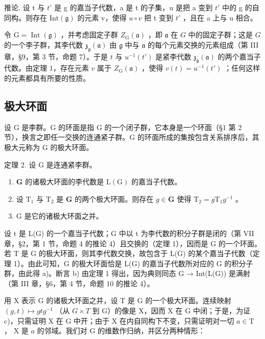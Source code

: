 推论. 设 t 与 \(t'\) 是 g 的嘉当子代数，a 是 t 的子集，u 是把 a 变到 \(t'\) 中的 g 的自同构。则存在 \(\text{Int}(\mathfrak{g})\) 的元素 v，使得 \(u \circ v\) 把 t 变到 \(t'\) ，且在 a 上与 u 相合。

令 \(\mathrm{G} = \operatorname{Int}(\mathfrak{g})\) ，并考虑固定子群 \(Z_{\mathrm{G}}(\mathfrak{a})\) ，即 \(\mathfrak{a}\) 在 \(G\) 中的固定子群；这是 \(G\) 的一个李子群，其李代数 \(\mathfrak{z}_{\mathfrak{g}}(\mathfrak{a})\) 由 \(\mathfrak{g}\) 中与 \(\mathfrak{a}\) 的每个元素交换的元素组成（第 III 章，§9，第 3 节，命题 7）。于是 \(t\) 与 \(u^{-1}(t')\) 是紧李代数 \(\mathfrak{z}_{\mathfrak{g}}(\mathfrak{a})\) 的两个嘉当子代数。由定理 1，存在元素 \(v\) 属于 \(Z_{\mathrm{G}}(\mathfrak{a})\) ，使得 \(v(t) = u^{-1}(t')\) ；任何这样的元素都具有所要的性质。

\subsection{极大环面}

设 G 是李群。G 的环面是指 G 的一个闭子群，它本身是一个环面（§1 第 2 节），换言之即任一交换的连通紧子群。G 的环面所成的集按包含关系排序后，其极大元称为 G 的极大环面。

定理 2. 设 G 是连通紧李群。

\begin{enumerate}
\def\labelenumi{\alph{enumi})}
\item
  \(\mathbf{G}\) 的诸极大环面的李代数是 \(\mathrm{L}(\mathrm{G})\) 的嘉当子代数。
\item
  设 \(\mathrm{T}_1\) 与 \(\mathrm{T}_2\) 是 \(\mathbf{G}\) 的两个极大环面。则存在 \(g \in \mathbf{G}\) 使得 \(\mathrm{T}_2 = g\mathrm{T}_1g^{-1}\) 。
\item
  G 是它的诸极大环面之并。
\end{enumerate}

设 t 是 L(G) 的一个嘉当子代数；G 中以 t 为李代数的积分子群是闭的（第 VII 章，§2，第 1 节，命题 4 的推论 4）且交换的（定理 1），因而是 G 的一个环面。若 T 是 G 的极大环面，则其李代数交换，故包含于 L(G) 的某个嘉当子代数（定理 1）。由此可知，G 的极大环面恰是 L(G) 的嘉当子代数所对应的 G 的积分子群，由此得 a)。断言 b) 由定理 1 得出，因为典则同态 G → Int(L(G)) 是满射（第 III 章，§6，第 4 节，命题 10 的推论 4）。

用 X 表示 G 的诸极大环面之并，设 T 是 G 的一个极大环面。连续映射 \((g,t)\mapsto gtg^{-1}\) （从 \(G\times T\) 到 G）的像是 X，因而 X 在 G 中闭；于是，为证 c)，只需证明 X 在 G 中开；由于 X 在内自同构下不变，只需证明对一切 \(a \in \mathrm{T}\) ， \(\mathrm{X}\) 是 \(a\) 的邻域。我们对 \(\mathrm{G}\) 的维数作归纳，并区分两种情形：

